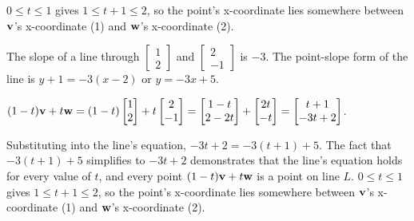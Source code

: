 \begin{solution}
\begin{enumerate}
\begin{answer}
	$0 \le t \le 1$ gives $1 \le t + 1 \le 2$, so the point's x-coordinate lies somewhere between $\mathbf{v}$'s x-coordinate (1) and $\mathbf{w}$'s x-coordinate (2).
	\end{answer}
	The slope of a line through $\begin{bmatrix} 1 \\ 2 \end{bmatrix}$ and $\begin{bmatrix} 2 \\ -1 \end{bmatrix}$ is $-3$. The point-slope form of the line is $y + 1 = -3(x - 2)$ or $y = -3x + 5$. 
	
	$(1 - t)\mathbf{v} + t\mathbf{w} = (1-t)\begin{bmatrix} 1 \\ 2 \end{bmatrix} + t\begin{bmatrix} 2 \\ -1 \end{bmatrix} = \begin{bmatrix} 1 - t \\ 2 - 2t \end{bmatrix} + \begin{bmatrix} 2t \\ -t \end{bmatrix} = \begin{bmatrix}t + 1\\-3t + 2 \end{bmatrix}$.
	
	Substituting into the line's equation, $-3t + 2 = -3(t + 1) + 5$. The fact that $-3(t + 1) + 5$ simplifies to $-3t + 2$ demonstrates that the line's equation holds for every value of $t$, and every point $(1 - t)\mathbf{v} + t\mathbf{w}$ is a point on line $L$. $0 \le t \le 1$ gives $1 \le t + 1 \le 2$, so the point's x-coordinate lies somewhere between $\mathbf{v}$'s x-coordinate (1) and $\mathbf{w}$'s x-coordinate (2).

\end{enumerate}
\end{solution}

